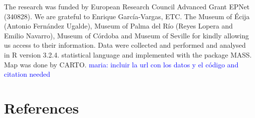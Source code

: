 \documentclass[review]{elsarticle}
\newcommand{\memo}[2]{\textcolor{#1}{#2}}
\newcommand{\maria}[1]{\memo{blue}{maria: #1\\}}
\begin{document}
The research was funded by European Research Council Advanced Grant EPNet (340828). We are grateful to Enrique Garc\'ia-Vargas, ETC. The Museum of \'Ecija (Antonio Fern\'andez Ugalde), Museum of Palma del R\'io (Reyes Lopera and Emilio Navarro), Museum of C\'ordoba and Museum of Seville for kindly allowing us access to their information.  
Data were collected and performed and analysed in R version 3.2.4. statistical language and implemented with the package MASS. Map was done by CARTO. 
\maria{incluir la url con los datos y el código and citation needed}


\section*{References}

%

\end{document}
